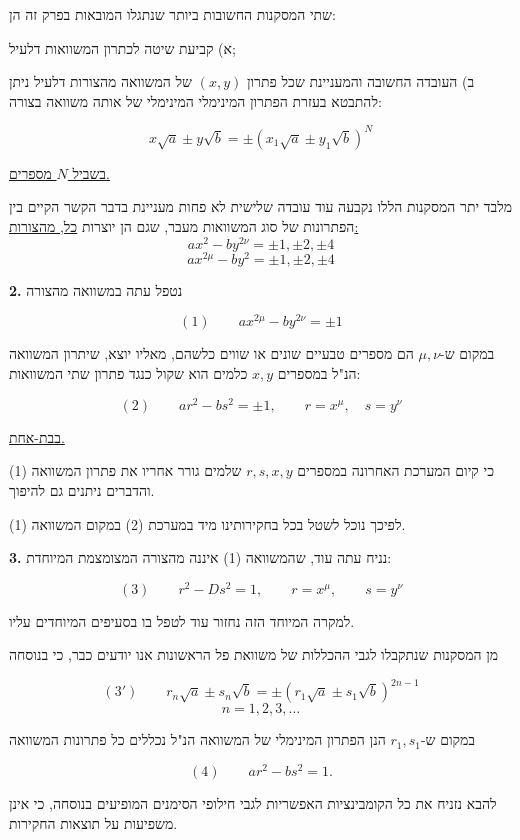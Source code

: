 שתי המסקנות החשובות ביותר שנתגלו המובאות בפרק זה הן:

א) קביעת שיטה לכתרון המשוואות דלעיל;

ב) העובדה החשובה והמעניינת שכל פתרון $(x,y)$ של המשוואה מהצורות
דלעיל ניתן להתבטא בעזרת הפתרון המינימלי המינימלי של אותה משוואה
בצורה:

\[ x\sqrt{a} \pm y\sqrt{b} = \pm(x_1\sqrt{a} \pm y_1\sqrt{b})^N \]

\underline{בשביל $N$ מספרים.}

מלבד יתר המסקנות הללו נקבעה עוד עובדה שלישית לא פחות מעניינת בדבר
הקשר הקיים בין הפתרונות של סוג המשוואות מעבר, שגם הן יוצרות
\underline{כל, מהצורות:}
\[ ax^2 - by^{2\nu} = \pm 1 , \pm 2 , \pm 4 \]
\[ ax^{2\mu} - by^2 = \pm 1 , \pm 2 , \pm 4 \]

\noindent\textbf{2.} נטפל עתה במשוואה מהצורה

\[ (1) \qquad ax^{2\mu} - by^{2\nu} = \pm 1 \]

במקום ש-$\mu, \nu$ הם מספרים טבעיים שונים או שווים כלשהם, מאליו יוצא,
שיתרון המשוואה הנ"ל במספרים $x, y$ כלמים הוא שקול כנגד פתרון שתי
המשוואות:

\[ (2) \qquad ar^2 - bs^2 = \pm 1 , \qquad r = x^{\mu} , \quad s = y^{\nu} \]

\underline{בבת-אחת.}

כי קיום המערכת האחרונה במספרים $r,s,x,y$ שלמים גורר אחריו את פתרון
המשוואה (1) והדברים ניתנים גם להיפוך.

לפיכך נוכל לשטל בכל בחקירותינו מיד במערכת (2) במקום המשוואה (1).

\noindent\textbf{3.} נניח עתה עוד, שהמשוואה (1) איננה מהצורה המצומצמת המיוחדת:

\[ (3) \qquad r^2 - Ds^2 = 1 , \qquad r = x^{\mu} , \qquad s = y^{\nu} \]

למקרה המיוחד הזה נחזור עוד לטפל בו בסעיפים המיוחדים עליו.

מן המסקנות שנתקבלו לגבי ההכללות של משוואת פל הראשונות אנו יודעים
כבר, כי בנוסחה

\[ (3') \qquad r_n\sqrt{a} \pm s_n\sqrt{b} = \pm(r_1\sqrt{a} \pm s_1\sqrt{b})^{2n-1} \]
\[ n = 1, 2, 3, \ldots \]

במקום ש-$r_1, s_1$ הנן הפתרון המינימלי של המשוואה הנ"ל נכללים כל
פתרונות המשוואה

\[ (4) \qquad ar^2 - bs^2 = 1 . \]

להבא נזניח את כל הקומבינציות האפשריות לגבי חילופי הסימנים המופיעים
בנוסחה, כי אינן משפיעות על תוצאות החקירות.

